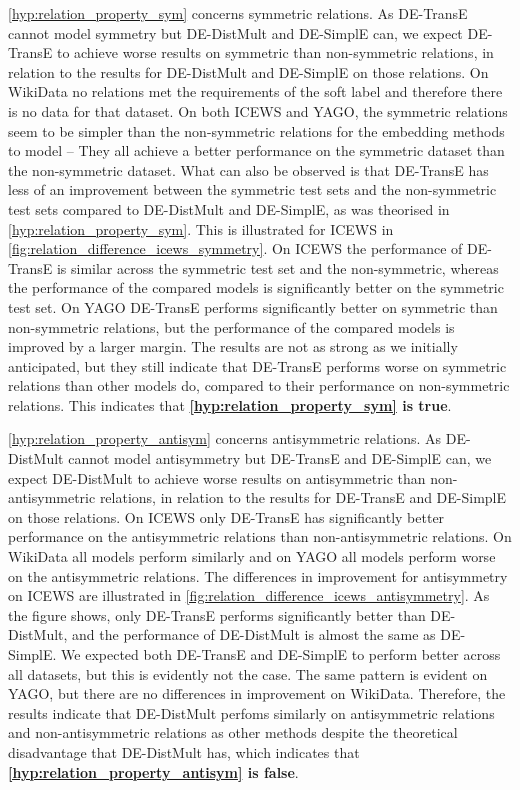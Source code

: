 \autoref{hyp:relation_property_sym} concerns symmetric relations. As DE-TransE cannot model symmetry but DE-DistMult and DE-SimplE can, we expect DE-TransE to achieve worse results on symmetric than non-symmetric relations, in relation to the results for DE-DistMult and DE-SimplE on those relations.
On WikiData no relations met the requirements of the soft label and therefore there is no data for that dataset.
On both ICEWS and YAGO, the symmetric relations seem to be simpler than the non-symmetric relations for the embedding methods to model -- They all achieve a better performance on the symmetric dataset than the non-symmetric dataset. What can also be observed is that DE-TransE has less of an improvement between the symmetric test sets and the non-symmetric test sets compared to DE-DistMult and DE-SimplE, as was theorised in \autoref{hyp:relation_property_sym}. This is illustrated for ICEWS in \autoref{fig:relation_difference_icews_symmetry}.
On ICEWS the performance of DE-TransE is similar across the symmetric test set and the non-symmetric, whereas the performance of the compared models is significantly better on the symmetric test set. On YAGO DE-TransE performs significantly better on symmetric than non-symmetric relations, but the performance of the compared models is improved by a larger margin.
The results are not as strong as we initially anticipated, but they still indicate that DE-TransE performs worse on symmetric relations than other models do, compared to their performance on non-symmetric relations. This indicates that \textbf{\autoref{hyp:relation_property_sym} is true}.



\autoref{hyp:relation_property_antisym} concerns antisymmetric relations. As DE-DistMult cannot model antisymmetry but DE-TransE and DE-SimplE can, we expect DE-DistMult to achieve worse results on antisymmetric than non-antisymmetric relations, in relation to the results for DE-TransE and DE-SimplE on those relations.
On ICEWS only DE-TransE has significantly better performance on the antisymmetric relations than non-antisymmetric relations.
On WikiData all models perform similarly and on YAGO all models perform worse on the antisymmetric relations.
The differences in improvement for antisymmetry on ICEWS are illustrated in \autoref{fig:relation_difference_icews_antisymmetry}.
As the figure shows, only DE-TransE performs significantly better than DE-DistMult, and the performance of DE-DistMult is almost the same as DE-SimplE.
We expected both DE-TransE and DE-SimplE to perform better across all datasets, but this is evidently not the case.
The same pattern is evident on YAGO, but there are no differences in improvement on WikiData.
Therefore, the results indicate that DE-DistMult perfoms similarly on antisymmetric relations and non-antisymmetric relations as other methods despite the theoretical disadvantage that DE-DistMult has, which indicates that \textbf{\autoref{hyp:relation_property_antisym} is false}.

